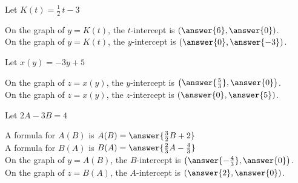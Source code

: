 \documentclass{ximera}
\author{Lee Wayand}
\begin{document}
\begin{exercise}


Let $K(t) = \frac{1}{2} \, t - 3$


On the graph of $y = K(t)$, the $t$-intercept is $\left( \answer{6}, \answer{0} \right)$. \\


On the graph of $y = K(t)$, the $y$-intercept is $\left( \answer{0}, \answer{-3} \right)$. 

\end{exercise}













\begin{exercise}


Let $x(y) = -3 y + 5$


On the graph of $z = x(y)$, the $y$-intercept is $\left( \answer{\frac{5}{3}}, \answer{0} \right)$. \\


On the graph of $z = x(y)$, the $z$-intercept is $\left( \answer{0}, \answer{5} \right)$. 

\end{exercise}













\begin{exercise}


Let $2A - 3B = 4$


A formula for $A(B)$ is $A(B) = \answer{\frac{3}{2}B+2}$ \\

A formula for $B(A)$ is $B(A) = \answer{\frac{2}{3}A - \frac{4}{3}}$ \\


On the graph of $y = A(B)$, the $B$-intercept is $\left( \answer{-\frac{4}{3}}, \answer{0} \right)$. \\


On the graph of $z = B(A)$, the $A$-intercept is $\left( \answer{2}, \answer{0} \right)$. 

\end{exercise}
\end{document}
